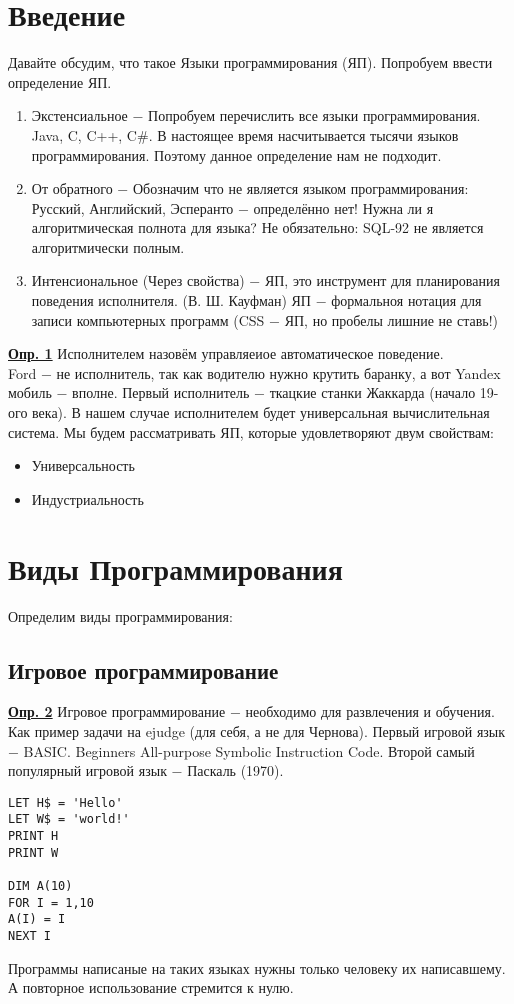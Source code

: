 \documentclass[a4paper, 12pt, titlepage, finall]{extreport}
\begin{document}
    \chapter*{Введение}
        Давайте обсудим, что такое Языки программирования (ЯП). Попробуем ввести определение ЯП.
        \begin{enumerate}
            \item Экстенсиальное $-$ Попробуем перечислить все языки программирования. Java, C, C++, C\#.
            В настоящее время насчитывается тысячи языков программирования. Поэтому данное определение нам не подходит.
            \item От обратного $-$ Обозначим что не является языком программирования: Русский, Английский, Эсперанто $-$ определённо нет!
            Нужна ли я алгоритмическая полнота для языка? Не обязательно: SQL-92 не является алгоритмически полным.
            \item Интенсиональное (Через свойства) $-$ ЯП, это инструмент для планирования поведения исполнителя. (В. Ш. Кауфман)
            ЯП $-$ формальноя нотация для записи компьютерных программ (CSS $-$ ЯП, но пробелы лишние не ставь!) 
        \end{enumerate}

        \underline{\bf Опр. 1} Исполнителем назовём управляеиое автоматическое поведение.\\
        Ford $-$ не исполнитель, так как водителю нужно крутить баранку, а вот Yandex мобиль $-$ вполне.
        Первый исполнитель $-$ ткацкие станки Жаккарда (начало 19-ого века).
        В нашем случае исполнителем будет универсальная вычислительная система. Мы будем рассматривать ЯП, которые удовлетворяют двум свойствам:
        \begin{itemize}
            \item Универсальность
            \item Индустриальность
        \end{itemize}
    \chapter{Виды Программирования}
        Определим виды программирования:
        \section{Игровое программирование}
            \underline{\bf Опр. 2} Игровое программирование $-$ необходимо для развлечения и обучения.\\
            Как пример задачи на ejudge (для себя, а не для Чернова).
            Первый игровой язык $-$ BASIC. Beginners All-purpose Symbolic Instruction Code.
            Второй самый популярный игровой язык $-$ Паскаль (1970).
\begin{lstlisting}
LET H$ = 'Hello'
LET W$ = 'world!'
PRINT H
PRINT W

DIM A(10)
FOR I = 1,10
A(I) = I
NEXT I
\end{lstlisting}
            Программы написаные на таких языках нужны только человеку их написавшему. А повторное использование стремится к нулю.
\end{document}
